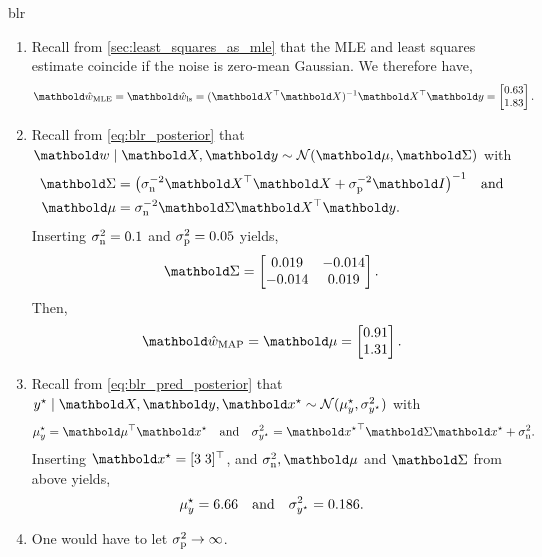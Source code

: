 \begin{solution}{blr}
  \begin{enumerate}[beginpenalty=10000]
    \item Recall from \cref{sec:least_squares_as_mle} that the MLE and least squares estimate coincide if the noise is zero-mean Gaussian. We therefore have, \begin{align*}
      \vwhat_\MLE = \vwhat_{\ls} = \inv{(\transpose{\mX}\mX)}\transpose{\mX}\vy = \begin{bmatrix}
        0.63 \\
        1.83
      \end{bmatrix}.
    \end{align*}

    \item Recall from \cref{eq:blr_posterior} that $\vw \mid \mX, \vy \sim \N{\vmu}{\mSigma}$ with \begin{align*}
      \mSigma &= \inv{\parentheses*{\sigman^{-2} \transpose{\mX}\mX + \sigmap^{-2} \mI}} \quad\text{and} \\
      \vmu &= \sigman^{-2} \mSigma \transpose{\mX} \vy.
    \end{align*}
    Inserting $\sigma_{\mathrm{n}}^2 = 0.1$ and $\sigma_{\mathrm{p}}^2 = 0.05$ yields, \begin{align*}
        \mSigma = \begin{bmatrix}
        0.019 & -0.014 \\
        -0.014 & 0.019
      \end{bmatrix}.
    \end{align*}
    Then, \begin{align*}
      \vwhat_\MAP = \vmu = \begin{bmatrix}
        0.91 \\
        1.31
      \end{bmatrix}.
    \end{align*}

    \item Recall from \cref{eq:blr_pred_posterior} that $\ys \mid \mX, \vy, \vxs \sim \N{\mu_\ys}{\sigma_{\ys}^2}$ with \begin{align*}
      \mu_\ys = \transpose{\vmu} \vxs \quad\text{and}\quad \sigma_{\ys}^2 = \transpose{\vxs} \mSigma \vxs + \sigman^2.
    \end{align*}
    Inserting $\vxs = \transpose{[3 \; 3]}$, and $\sigman^2, \vmu$ and $\mSigma$ from above yields, \begin{align*}
      \mu_y^\star = 6.66 \quad\text{and}\quad \sigma_{y^\star}^2 = 0.186.
    \end{align*}

    \item One would have to let $\sigma_{\mathrm{p}}^2 \to \infty$.
  \end{enumerate}
\end{solution}

